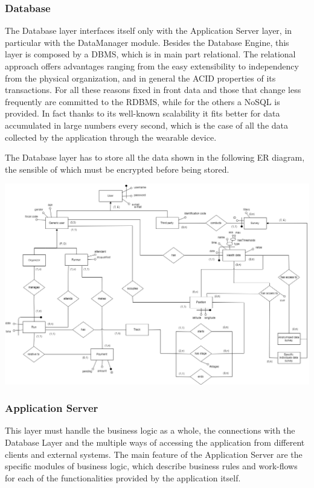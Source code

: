 \subsubsection{Database}
The Database layer interfaces itself only with the Application Server layer, in particular with the DataManager module. Besides the Database Engine, this layer is composed by a DBMS, which is in main part relational. The relational approach offers advantages ranging from the easy extensibility to independency from the physical organization, and in general the ACID properties of its transactions. For all these reasons fixed in front data and those that change less frequently are committed to the RDBMS, while for the others a NoSQL is provided. In fact thanks to its well-known scalability it fits better for data accumulated in large numbers every second, which is the case of all the data collected by the application through the wearable device.

The Database layer has to store all the data shown in the following ER diagram, the sensible of which must be encrypted before being stored.

\begin{center}
\includegraphics[scale=0.35]{sections/diagrams/ER.png}
\newline
{}
\end{center}

\subsubsection{Application Server}
This layer must handle the business logic as a whole, the connections with the Database Layer and the multiple ways of accessing the application from different clients and external systems. The main feature of the Application Server are the specific modules of business logic, which describe business rules and work-flows for each of the functionalities provided by the application itself. \newline


